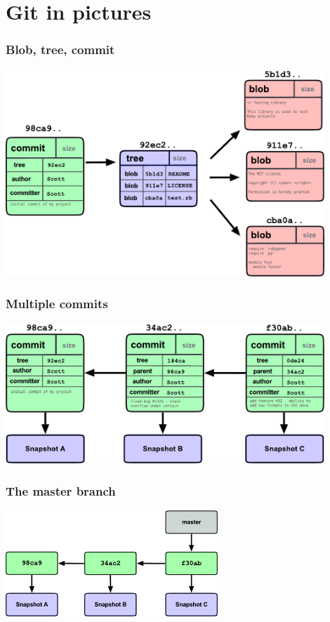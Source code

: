 \documentclass{gittalk}
\begin{document}
\section{Git in pictures}

\begin{frame}
  \frametitle{Blob, tree, commit}
\begin{center}
  \includegraphics[width=0.9\textwidth]{./img/fig0301.pdf}
\end{center}
\end{frame}

\begin{frame}
  \frametitle{Multiple commits}
  \vspace*{2em}
\begin{center}
  \includegraphics[width=0.9\textwidth]{./img/fig0302.pdf}
\end{center}
\end{frame}

\begin{frame}
  \frametitle{The master branch}
  \vspace*{2em}
\begin{center}
  \includegraphics[width=0.6\textwidth]{./img/fig0303.pdf}
\end{center}
\end{frame}
\end{document}

